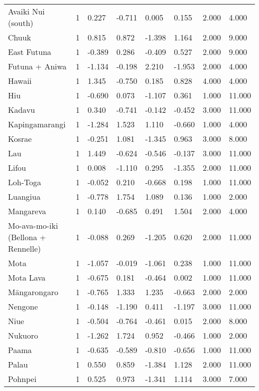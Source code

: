 \begin{longtable}{p{4.5cm}p{1.4cm}p{1.4cm}p{1.4cm}p{1.4cm}p{1.7cm}p{1.7cm}p{1.7cm}}
  Avaiki Nui (south) & 1 & 0.227 & -0.711 & 0.005 & 0.155 & 2.000 & 4.000 \\ 
  Chuuk & 1 & 0.815 & 0.872 & -1.398 & 1.164 & 2.000 & 9.000 \\ 
  East Futuna & 1 & -0.389 & 0.286 & -0.409 & 0.527 & 2.000 & 9.000 \\ 
  Futuna + Aniwa & 1 & -1.134 & -0.198 & 2.210 & -1.953 & 2.000 & 4.000 \\ 
  Hawaii & 1 & 1.345 & -0.750 & 0.185 & 0.828 & 4.000 & 4.000 \\ 
  Hiu & 1 & -0.690 & 0.073 & -1.107 & 0.361 & 1.000 & 11.000 \\ 
  Kadavu & 1 & 0.340 & -0.741 & -0.142 & -0.452 & 3.000 & 11.000 \\ 
  Kapingamarangi & 1 & -1.284 & 1.523 & 1.110 & -0.660 & 1.000 & 4.000 \\ 
  Kosrae & 1 & -0.251 & 1.081 & -1.345 & 0.963 & 3.000 & 8.000 \\ 
  Lau & 1 & 1.449 & -0.624 & -0.546 & -0.137 & 3.000 & 11.000 \\ 
  Lifou & 1 & 0.008 & -1.110 & 0.295 & -1.355 & 2.000 & 11.000 \\ 
  Loh-Toga & 1 & -0.052 & 0.210 & -0.668 & 0.198 & 1.000 & 11.000 \\ 
  Luangiua & 1 & -0.778 & 1.754 & 1.089 & 0.136 & 1.000 & 2.000 \\ 
  Mangareva & 1 & 0.140 & -0.685 & 0.491 & 1.504 & 2.000 & 4.000 \\ 
  Mo-ava-mo-iki (Bellona + Rennelle) & 1 & -0.088 & 0.269 & -1.205 & 0.620 & 2.000 & 11.000 \\ 
  Mota & 1 & -1.057 & -0.019 & -1.061 & 0.238 & 1.000 & 11.000 \\ 
  Mota Lava & 1 & -0.675 & 0.181 & -0.464 & 0.002 & 1.000 & 11.000 \\ 
  Māngarongaro & 1 & -0.765 & 1.333 & 1.235 & -0.663 & 2.000 & 2.000 \\ 
  Nengone & 1 & -0.148 & -1.190 & 0.411 & -1.197 & 3.000 & 11.000 \\ 
  Niue & 1 & -0.504 & -0.764 & -0.461 & 0.015 & 2.000 & 8.000 \\ 
  Nukuoro & 1 & -1.262 & 1.724 & 0.952 & -0.466 & 1.000 & 2.000 \\ 
  Paama & 1 & -0.635 & -0.589 & -0.810 & -0.656 & 1.000 & 11.000 \\ 
  Palau & 1 & 0.550 & 0.859 & -1.384 & 1.128 & 2.000 & 11.000 \\ 
  Pohnpei & 1 & 0.525 & 0.973 & -1.341 & 1.114 & 3.000 & 7.000 \\ 

\end{longtable}
